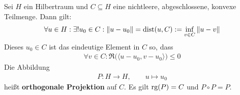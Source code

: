 \begin{lemma}
Sei $H$ ein Hilbertraum und $C\subseteq H$ eine nichtleere, abgeschlossene, konvexe Teilmenge. Dann gilt:
\begin{align*}
\forall u\in H:\exists! u_0\in C:\Vert u-u_0\Vert
=\text{dist}(u,C)
:=\inf\limits_{v\in C}\Vert u-v\Vert
\end{align*}
Dieses $u_0\in C$ ist das eindeutige Element in $C$ so, dass 
\begin{align*}
\forall v\in C:\Re\big(\langle u-u_0,v-u_0\rangle\big)\leq0
\end{align*}
Die Abbildung
\begin{align*}
P:H\to H,\qquad u\mapsto u_0
\end{align*}
heißt \textbf{orthogonale Projektion} auf $C$. Es gilt $\text{rg}(P)=C$ und $P\circ P=P$.
\end{lemma}
